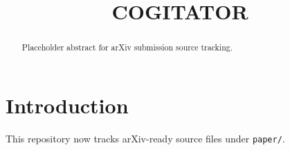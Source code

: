 \documentclass[11pt]{article}
\title{COGITATOR}
\author{}
\date{}
\begin{document}
\maketitle

\begin{abstract}
Placeholder abstract for arXiv submission source tracking.
\end{abstract}

\section{Introduction}
This repository now tracks arXiv-ready source files under \texttt{paper/}.
\end{document}

